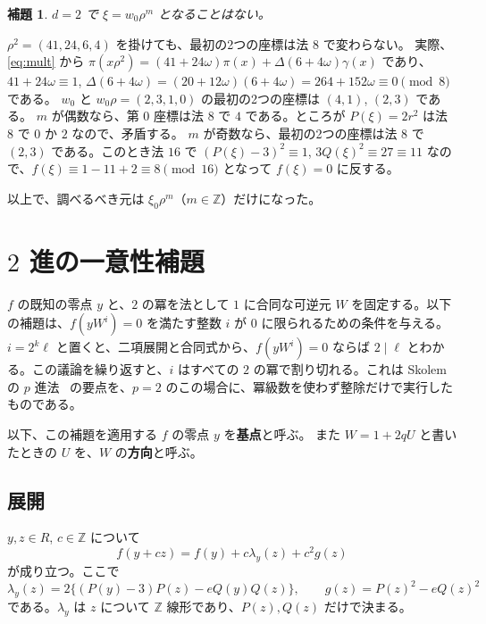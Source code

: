 \documentclass[a4paper,11pt]{ltjsarticle}
\makeatletter
\theoremstyle{jplain}
\newtheorem{lemma}[theorem]{補題}
\renewcommand{\proofname}{証明}
\renewenvironment{proof}[1][\proofname]{\par\pushQED{\qed}\normalfont\topsep6\p@\@plus6\p@\relax
  \trivlist\item[\hskip\labelsep\bfseries #1]\ignorespaces}{\popQED\endtrivlist\@endpefalse}
\numberwithin{equation}{section}
\numberwithin{table}{section}
\newcommand{\Z}{\mathbb{Z}}
\newcommand{\tsec}[2]{\texorpdfstring{#1}{#2}}
\makeatother
\begin{document}
\begin{lemma}\label{lem:extra}
$d=2$ で $\xi=w_0\rho^m$ となることはない。
\end{lemma}

\begin{proof}
$\rho^2=(41,24,6,4)$ を掛けても、最初の2つの座標は法 $8$ で変わらない。
実際、\eqref{eq:mult} から $\pi(x\rho^2)=(41+24\omega)\pi(x)+\Delta(6+4\omega)\gamma(x)$ であり、$41+24\omega\equiv1$, $\Delta(6+4\omega)=(20+12\omega)(6+4\omega)=264+152\omega\equiv0\pmod8$ である。
$w_0$ と $w_0\rho=(2,3,1,0)$ の最初の2つの座標は $(4,1)$, $(2,3)$ である。
$m$ が偶数なら、第 $0$ 座標は法 $8$ で $4$ である。ところが $P(\xi)=2r^2$ は法 $8$ で $0$ か $2$ なので、矛盾する。
$m$ が奇数なら、最初の2つの座標は法 $8$ で $(2,3)$ である。このとき法 $16$ で $(P(\xi)-3)^2\equiv1$, $3Q(\xi)^2\equiv27\equiv11$ なので、$f(\xi)\equiv1-11+2\equiv8\pmod{16}$ となって $f(\xi)=0$ に反する。
\end{proof}

以上で、調べるべき元は $\xi_0\rho^m$（$m\in\Z$）だけになった。

\section{\tsec{$2$}{2} 進の一意性補題}\label{sec:dyadic}

$f$ の既知の零点 $y$ と、$2$ の冪を法として $1$ に合同な可逆元 $W$ を固定する。以下の補題は、$f(yW^i)=0$ を満たす整数 $i$ が $0$ に限られるための条件を与える。
$i=2^k\ell$ と置くと、二項展開と合同式から、$f(yW^i)=0$ ならば $2\mid\ell$ とわかる。この議論を繰り返すと、$i$ はすべての $2$ の冪で割り切れる。これは Skolem の $p$ 進法~\cite{Skolem1935} の要点を、$p=2$ のこの場合に、冪級数を使わず整除だけで実行したものである。

以下、この補題を適用する $f$ の零点 $y$ を\textbf{基点}と呼ぶ。
また $W=1+2qU$ と書いたときの $U$ を、$W$ の\textbf{方向}と呼ぶ。

\subsection{展開}

$y,z\in R$, $c\in\Z$ について
\begin{equation}\label{eq:expand}
f(y+cz)=f(y)+c\lambda_y(z)+c^2g(z)
\end{equation}
が成り立つ。ここで
\[
\lambda_y(z)=2\bigl\{(P(y)-3)P(z)-eQ(y)Q(z)\bigr\},\qquad g(z)=P(z)^2-eQ(z)^2
\]
である。$\lambda_y$ は $z$ について $\Z$ 線形であり、$P(z),Q(z)$ だけで決まる。
\end{document}
